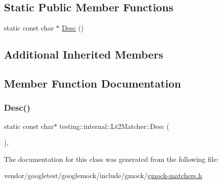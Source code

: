 \subsection*{Static Public Member Functions}
\begin{DoxyCompactItemize}
\item 
static const char $\ast$ \hyperlink{classtesting_1_1internal_1_1_lt2_matcher_ae5d3129050392105e21755f39b933b09}{Desc} ()
\end{DoxyCompactItemize}
\subsection*{Additional Inherited Members}


\subsection{Member Function Documentation}
\mbox{\label{classtesting_1_1internal_1_1_lt2_matcher_ae5d3129050392105e21755f39b933b09}} 
\subsubsection{\texorpdfstring{Desc()}{Desc()}}
{\footnotesize\ttfamily static const char$\ast$ testing\+::internal\+::\+Lt2\+Matcher\+::\+Desc (\begin{DoxyParamCaption}{ }\end{DoxyParamCaption})\hspace{0.3cm}{\ttfamily [inline]}, {\ttfamily [static]}}



The documentation for this class was generated from the following file\+:\begin{DoxyCompactItemize}
\item 
vendor/googletest/googlemock/include/gmock/\hyperlink{gmock-matchers_8h}{gmock-\/matchers.\+h}\end{DoxyCompactItemize}
